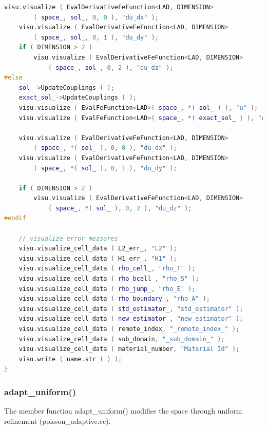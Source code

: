\documentclass[a4paper, 11pt, twoside]{article}
\begin{document}
\begin{lstlisting}[language=C++, basicstyle={\footnotesize, \ttfamily}, keywordstyle=\color{blue}, numbers=none, tabsize=4]
    visu.visualize ( EvalDerivativeFeFunction<LAD, DIMENSION>
        ( space_, sol_, 0, 0 ), "du_dx" );
    visu.visualize ( EvalDerivativeFeFunction<LAD, DIMENSION>
        ( space_, sol_, 0, 1 ), "du_dy" );
    if ( DIMENSION > 2 )
        visu.visualize ( EvalDerivativeFeFunction<LAD, DIMENSION>
            ( space_, sol_, 0, 2 ), "du_dz" );
#else
    sol_->UpdateCouplings ( );
    exact_sol_->UpdateCouplings ( );
    visu.visualize ( EvalFeFunction<LAD>( space_, *( sol_ ) ), "u" );
    visu.visualize ( EvalFeFunction<LAD>( space_, *( exact_sol_ ) ), "exact" );

    visu.visualize ( EvalDerivativeFeFunction<LAD, DIMENSION>
        ( space_, *( sol_ ), 0, 0 ), "du_dx" );
    visu.visualize ( EvalDerivativeFeFunction<LAD, DIMENSION>
        ( space_, *( sol_ ), 0, 1 ), "du_dy" );

    if ( DIMENSION > 2 )
        visu.visualize ( EvalDerivativeFeFunction<LAD, DIMENSION>
            ( space_, *( sol_ ), 0, 2 ), "du_dz" );
#endif

    // visualize error measures
    visu.visualize_cell_data ( L2_err_, "L2" );
    visu.visualize_cell_data ( H1_err_, "H1" );
    visu.visualize_cell_data ( rho_cell_, "rho_T" );
    visu.visualize_cell_data ( rho_bcell_, "rho_S" );
    visu.visualize_cell_data ( rho_jump_, "rho_E" );
    visu.visualize_cell_data ( rho_boundary_, "rho_A" );
    visu.visualize_cell_data ( std_estimator_, "std_estimator" );
    visu.visualize_cell_data ( new_estimator_, "new_estimator" );
    visu.visualize_cell_data ( remote_index, "_remote_index_" );
    visu.visualize_cell_data ( sub_domain, "_sub_domain_" );
    visu.visualize_cell_data ( material_number, "Material Id" );
    visu.write ( name.str ( ) );
}
\end{lstlisting}

\subsubsection{adapt\_uniform()}\label{adaptuni}
The member function adapt\_uniform() modifies the space through uniform refinement (poisson\_adaptive.cc). 
\end{document}
